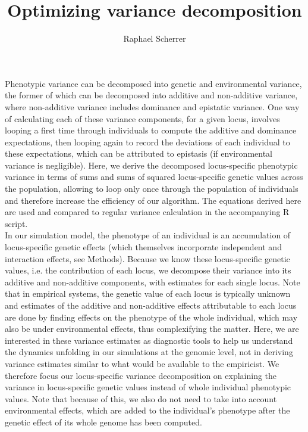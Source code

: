 \documentclass[]{article}
\title{Optimizing variance decomposition}
\author{Raphael Scherrer}
\begin{document}
\maketitle

Phenotypic variance can be decomposed into genetic and environmental variance, the former of which can be decomposed into additive and non-additive variance, where non-additive variance includes dominance and epistatic variance. One way of calculating each of these variance components, for a given locus, involves looping a first time through individuals to compute the additive and dominance expectations, then looping again to record the deviations of each individual to these expectations, which can be attributed to epistasis (if environmental variance is negligible). Here, we derive the decomposed locus-specific phenotypic variance in terms of sums and sums of squared locus-specific genetic values across the population, allowing to loop only once through the population of individuals and therefore increase the efficiency of our algorithm. The equations derived here are used and compared to regular variance calculation in the accompanying R script.\\

In our simulation model, the phenotype of an individual is an accumulation of locus-specific genetic effects (which themselves incorporate independent and interaction effects, see Methods). Because we know these locus-specific genetic values, i.e. the contribution of each locus, we decompose their variance into its additive and non-additive components, with estimates for each single locus. Note that in empirical systems, the genetic value of each locus is typically unknown and estimates of the additive and non-additive effects attributable to each locus are done by finding effects on the phenotype of the whole individual, which may also be under environmental effects, thus complexifying the matter. Here, we are interested in these variance estimates as diagnostic tools to help us understand the dynamics unfolding in our simulations at the genomic level, not in deriving variance estimates similar to what would be available to the empiricist. We therefore focus our locus-specific variance decomposition on explaining the variance in locus-specific genetic values instead of whole individual phenotypic values. Note that because of this, we also do not need to take into account environmental effects, which are added to the individual's phenotype after the genetic effect of its whole genome has been computed.\\
\end{document}
